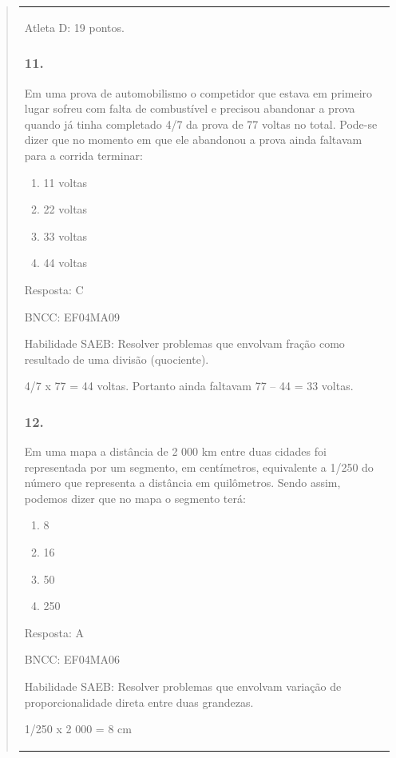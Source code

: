 \begin{enumerate}
\begin{escolha}
\begin{enumerate}
\begin{itemize}
\begin{itemize}
\begin{escolha}
\begin{quote}
\begin{escolha}
{\begin{longtable}[]{@{}l@{}}
\begin{itemize}
Atleta D: 19 pontos.

\subsubsection{11.}\label{section-197}

Em uma prova de automobilismo o competidor que estava em primeiro lugar
sofreu com falta de combustível e precisou abandonar a prova quando já
tinha completado 4/7 da prova de 77 voltas no total. Pode-se dizer que
no momento em que ele abandonou a prova ainda faltavam para a corrida
terminar:

\begin{enumerate}
\def\labelenumi{\alph{enumi})}
\item
  11 voltas
\item
  22 voltas
\item
  33 voltas
\item
  44 voltas
\end{enumerate}

Resposta: C

BNCC: EF04MA09

Habilidade SAEB: Resolver problemas que envolvam fração como resultado
de uma divisão (quociente).

4/7 x 77 = 44 voltas. Portanto ainda faltavam 77 -- 44 = 33 voltas.

\subsubsection{12.}\label{section-198}

Em uma mapa a distância de 2 000 km entre duas cidades foi representada
por um segmento, em centímetros, equivalente a 1/250 do número que
representa a distância em quilômetros. Sendo assim, podemos dizer que no
mapa o segmento terá:

\begin{enumerate}
\def\labelenumi{\alph{enumi})}
\item
  8
\item
  16
\item
  50
\item
  250
\end{enumerate}

Resposta: A

BNCC: EF04MA06

Habilidade SAEB: Resolver problemas que envolvam variação de
proporcionalidade direta entre duas grandezas.

1/250 x 2 000 = 8 cm


\end{itemize}
\end{longtable}}
\end{escolha}
\end{quote}
\end{escolha}
\end{itemize}
\end{itemize}
\end{enumerate}
\end{escolha}
\end{enumerate}
